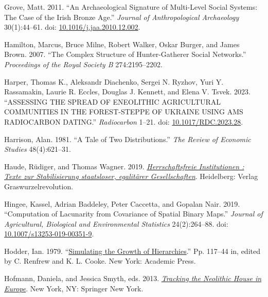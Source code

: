 \documentclass[
  12pt,
]{book}
\newlength{\cslhangindent}
\newlength{\cslentryspacingunit} %
\newenvironment{CSLReferences}[2] %
 {%
  \setlength{\parindent}{0pt}
  \ifodd #1
  \let\oldpar\par
  \def\par{\hangindent=\cslhangindent\oldpar}
  \fi
  \setlength{\parskip}{#2\cslentryspacingunit}
 }%
 {}
\begin{document}
\begin{CSLReferences}{1}{0}
\leavevmode{}%
Grove, Matt. 2011. {``An Archaeological Signature of Multi-Level Social Systems: The Case of the Irish Bronze Age.''} \emph{Journal of Anthropological Archaeology} 30(1):44--61. doi: \href{https://doi.org/10.1016/j.jaa.2010.12.002}{10.1016/j.jaa.2010.12.002}.

\leavevmode{}%
Hamilton, Marcus, Bruce Milne, Robert Walker, Oskar Burger, and James Brown. 2007. {``The Complex Structure of Hunter-Gatherer Social Networks.''} \emph{Proceedings of the Royal Society B} 274:2195--2202.

\leavevmode{}%
Harper, Thomas K., Aleksandr Diachenko, Sergei N. Ryzhov, Yuri Y. Rassamakin, Laurie R. Eccles, Douglas J. Kennett, and Elena V. Tsvek. 2023. {``ASSESSING THE SPREAD OF ENEOLITHIC AGRICULTURAL COMMUNITIES IN THE FOREST-STEPPE OF UKRAINE USING AMS RADIOCARBON DATING.''} \emph{Radiocarbon} 1--21. doi: \href{https://doi.org/10.1017/RDC.2023.28}{10.1017/RDC.2023.28}.

\leavevmode{}%
Harrison, Alan. 1981. {``A Tale of Two Distributions.''} \emph{The Review of Economic Studies} 48(4):621--31.

\leavevmode{}%
Haude, Rüdiger, and Thomas Wagner. 2019. \emph{\href{http://www.deutsche-digitale-bibliothek.de/item/7WYRGHTXGAOZOF5JUQ5JQCONFJKLTBIE}{Herrschaftsfreie Institutionen : Texte zur Stabilisierung staatsloser, egalitärer Gesellschaften}}. Heidelberg: Verlag Graswurzelrevolution.

\leavevmode{}%
Hingee, Kassel, Adrian Baddeley, Peter Caccetta, and Gopalan Nair. 2019. {``Computation of Lacunarity from Covariance of Spatial Binary Maps.''} \emph{Journal of Agricultural, Biological and Environmental Statistics} 24(2):264--88. doi: \href{https://doi.org/10.1007/s13253-019-00351-9}{10.1007/s13253-019-00351-9}.

\leavevmode{}%
Hodder, Ian. 1979. {``\href{https://doi.org/10.1016/B978-0-12-586050-5.50015-4}{Simulating the Growth of Hierarchies}.''} Pp. 117--44 in, edited by C. Renfrew and K. L. Cooke. New York: Academic Press.

\leavevmode{}%
Hofmann, Daniela, and Jessica Smyth, eds. 2013. \emph{\href{https://doi.org/10.1007/978-1-4614-5289-8}{Tracking the Neolithic House in Europe}}. New York, NY: Springer New York.


\end{CSLReferences}
\end{document}
